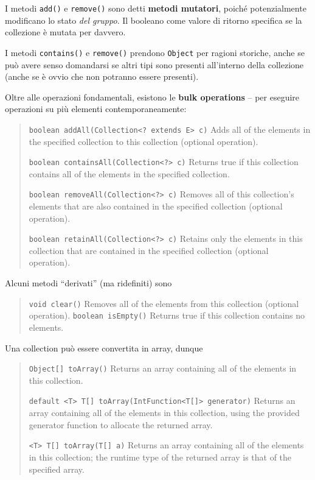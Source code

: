 \documentclass[\fontsizeclass,twocolumn]{\classname}
\theoremstyle{definition}
\theoremstyle{definition}
\begin{document}
I metodi \texttt{add()} e \texttt{remove()} sono detti \textbf{metodi
mutatori}, poiché potenzialmente modificano lo stato \emph{del gruppo}. Il
booleano come valore di ritorno specifica se la collezione è mutata per
davvero.

I metodi \texttt{contains()} e \texttt{remove()} prendono \texttt{Object} per
ragioni storiche, anche se può avere senso domandarsi se altri tipi sono
presenti all'interno della collezione (anche se è ovvio che non potranno essere
presenti).

Oltre alle operazioni fondamentali, esistono le \textbf{bulk operations} -- per
eseguire operazioni su più elementi contemporaneamente:

\begin{quote}
    \footnotesize{\texttt{boolean	addAll(Collection<? extends E> c)}	Adds all of the elements in the specified collection to this collection (optional operation).

\texttt{boolean	containsAll(Collection<?> c)}	Returns true if this collection contains all of the elements in the specified collection.

\texttt{boolean	removeAll(Collection<?> c)}	Removes all of this collection's elements that are also contained in the specified collection (optional operation).

\texttt{boolean	retainAll(Collection<?> c)}	Retains only the elements in this collection that are contained in the specified collection (optional operation).
}
\end{quote}

Alcuni metodi ``derivati'' (ma ridefiniti) sono
\begin{quote}
    \footnotesize{\texttt{void	clear()}	Removes all of the elements from this collection (optional operation).
\texttt{boolean	isEmpty()}	Returns true if this collection contains no elements.}
\end{quote}

Una collection può essere convertita in array, dunque
\begin{quote}
    \footnotesize{\texttt{Object[]	toArray()}	Returns an array containing all of the elements in this collection.

\texttt{default <T> T[]	toArray(IntFunction<T[]> generator)}	Returns an array containing all of the elements in this collection, using the provided generator function to allocate the returned array.

\texttt{<T> T[]	toArray(T[] a)}	Returns an array containing all of the elements in this collection; the runtime type of the returned array is that of the specified array.}
\end{quote}
\end{document}
